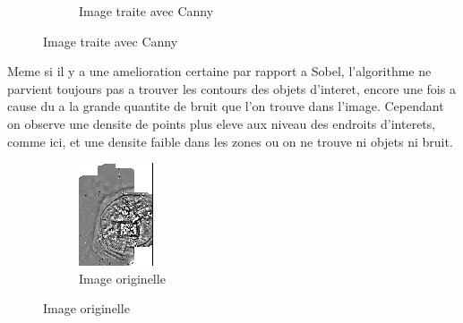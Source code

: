 \documentclass[a4paper, 12pt, titlepage, oneside]{article}
\begin{document}
\begin{figure}[!h]
\begin{subfigure}[b]{0.4\linewidth}
			\caption{Image traite avec Canny}
		\end{subfigure}
		\label{fig:OurCanny}
	\end{figure}

	Meme si il y a une amelioration certaine par rapport a Sobel, l'algorithme ne parvient toujours pas a trouver les contours des objets d'interet, encore une fois a cause du a la grande quantite de bruit que l'on trouve dans l'image. Cependant  on observe une densite de points plus eleve aux niveau des endroits d'interets, comme ici, et une densite faible dans les zones ou on ne trouve ni objets ni bruit.

	\begin{figure}[]%
		\centering
		\begin{subfigure}[b]{0.4\linewidth}
			\includegraphics[width=\linewidth]{CANNY_ExempleDetailsA.png}
			\caption{Image originelle}
		\end{subfigure}

\end{figure}
\end{document}
